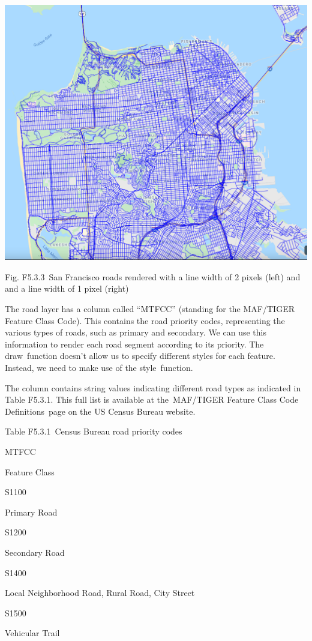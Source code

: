 \documentclass[
  letterpaper,
  DIV=11,
  numbers=noendperiod]{scrreprt}
\begin{document}
\includegraphics{./F5/image31.png}

Fig. F5.3.3~San Francisco roads rendered with a line width of 2 pixels
(left) and and a line width of 1 pixel (right)

The road layer has a column called ``MTFCC'' (standing for the MAF/TIGER
Feature Class Code). This contains the road priority codes, representing
the various types of roads, such as primary and secondary. We can use
this information to render each road segment according to its priority.
The draw~function doesn't allow us to specify different styles for each
feature. Instead, we need to make use of the style~function.

The column contains string values indicating different road types as
indicated in Table F5.3.1. This full list is available at the~MAF/TIGER
Feature Class Code Definitions~page on the US Census Bureau website.

Table F5.3.1~Census Bureau road priority codes

MTFCC

Feature Class

S1100

Primary Road

S1200

Secondary Road

S1400

Local Neighborhood Road, Rural Road, City Street

S1500

Vehicular Trail
\end{document}
